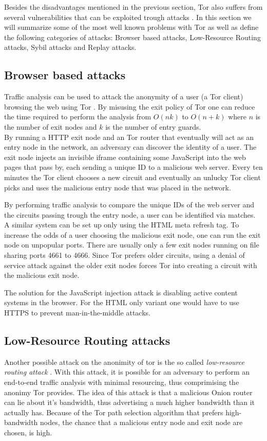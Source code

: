 \documentclass{article}
\begin{document}
	Besides the disadvantages mentioned in the previous section, Tor also suffers from several vulnerabilities that can be exploited trough attacks \cite{abbott2007browser, douceur2002sybil, bauer2007low}. In this section we will summarize some of the most well known problems with Tor as well as define the following categories of attacks: Browser based attacks, Low-Resource Routing attacks, Sybil attacks and Replay attacks.

	\subsection{Browser based attacks}
		Traffic analysis can be used to attack the anonymity of a user (a Tor client) browsing the web using Tor \cite{abbott2007browser}. By misusing the exit policy of Tor one can reduce the time required to perform the analysis from $O(nk)$ to $O(n+k)$ where $n$ is the number of exit nodes and $k$ is the number of entry guards.\\

		By running a HTTP exit node and an Tor router that eventually will act as an entry node in the network, an adversary can discover the identity of a user. The exit node injects an invisible iframe containing some JavaScript into the web pages that pass by, each sending a unique ID to a malicious web server. Every ten minutes the Tor client chooses a new circuit and eventually an unlucky Tor client picks and uses the malicious entry node that was placed in the network.

		By performing traffic analysis to compare the unique IDs of the web server and the circuits passing trough the entry node, a user can be identified via matches. A similar system can be set up only using the HTML meta refresh tag. To increase the odds of a user choosing the malicious exit node, one can run the exit node on unpopular ports. There are usually only a few exit nodes running on file sharing ports 4661 to 4666. Since Tor prefers older circuits, using a denial of service attack against the older exit nodes forces Tor into creating a circuit with the malicious exit node.

		The solution for the JavaScript injection attack is disabling active content systems in the browser. For the HTML only variant one would have to use HTTPS to prevent man-in-the-middle attacks.
		
	\subsection{Low-Resource Routing attacks}
		Another possible attack on the anonimity of tor is the so called \emph{low-resource routing attack} \cite{bauer2007low}. With this attack, it is possible for an adversary to perform an end-to-end traffic analysis with minimal resourcing, thus comprimising the anonimy Tor provides. The idea of this attack is that a malicious Onion router can lie about it's bandwidth, thus advertising a much higher bandwidth than it actually has. Because of the Tor path selection algorithm that prefers high-bandwidth nodes, the chance that a malicious entry node and exit node are chosen, is high.
\end{document}
